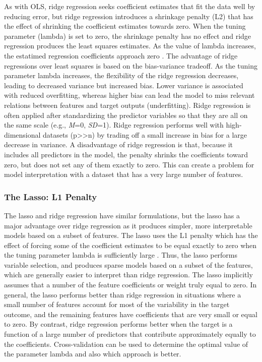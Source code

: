 \documentclass[sigconf]{acmart}
\begin{document}
As with OLS, ridge regression seeks coefficient estimates that fit the data 
well by reducing error, but ridge regression introduces a shrinkage penalty
(L2) that has the effect of shrinking the coefficient estimates towards zero. 
When the tuning parameter (lambda) is set to zero, the shrinkage penalty has 
no effect and ridge regression produces the least squares estimates. As the 
value of lambda increases, the estatimed regression coefficients approach zero 
\cite{statlearn13}. The advantage of ridge regressions over least squares is 
based on the bias-variance tradeoff. As the tuning parameter lambda increases, 
the flexibility of the ridge regression decreases, leading to decreased variance 
but increased bias. Lower variance is associated with reduced overfitting, 
whereas higher bias can lead the model to miss relevant relations between
features and target outputs (underfitting). Ridge regression is often applied 
after standardizing the predictor variables so that they are all on the same 
scale (e.g., \textit{M}=0, \textit{SD}=1). Ridge regression performs well with
high-dimensional datasets (p>>n) by trading off a small increase in bias for a 
large decrease in variance. A disadvantage of ridge regression is that, because 
it includes all predictors in the model, the penalty shrinks the coefficients 
toward zero, but does not set any of them exactly to zero. This can create a 
problem for model interpretation with a dataset that has a very large number
of features. 


\subsubsection{The Lasso: L1 Penalty} 

The lasso and ridge regression have similar formulations, but the lasso has 
a major advantage over ridge regression as it produces simpler, more 
interpretable models based on a subset of features. The lasso uses the L1 
penalty which has the effect of forcing some of the coefficient estimates to be
equal exactly to zero when the tuning parameter lambda is sufficiently large 
\cite{statlearn13}. Thus, the lasso performs variable selection, and produces 
sparse models based on a subset of the features, which are generally easier to 
interpret than ridge regression. The lasso implicitly assumes that a number of 
the feature coefficients or weight truly equal to zero. In general, the lasso 
performs better than ridge regression in situations where a small number of 
features account for most of the variability in the target outcome, and the 
remaining features have coefficients that are very small or equal to zero. 
By contrast, ridge regression performs better when the target is a function 
of a large number of predictors that contribute approximately equally to the
coefficients. Cross-validation can be used to determine the optimal value
of the parameter lambda and also which approach is better. 
\end{document}
